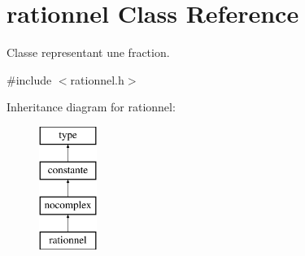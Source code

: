 \hypertarget{classrationnel}{\section{rationnel Class Reference}
\label{classrationnel}
}


Classe representant une fraction.  




{\ttfamily \#include $<$rationnel.\-h$>$}

Inheritance diagram for rationnel\-:\begin{figure}[H]
\begin{center}
\leavevmode
\includegraphics[height=4.000000cm]{classrationnel}
\end{center}
\end{figure}
